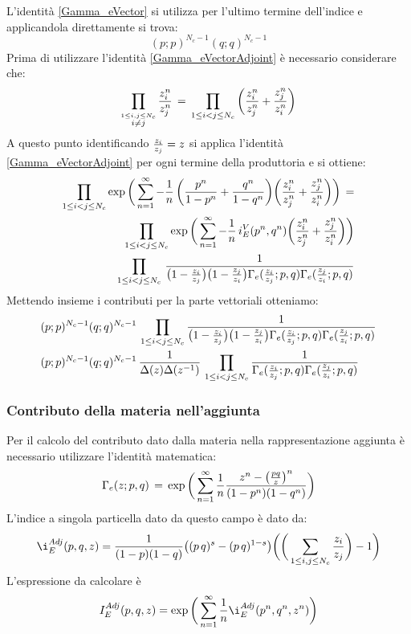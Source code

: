 \documentclass[a4paper,12pt]{article}
\begin{document}
L'identità \ref{Gamma_eVector} si utilizza per l'ultimo termine dell'indice e applicandola direttamente si trova:
$$
	(p;p)^{N_c-1} ( q;q)^{N_c-1}
$$
 Prima di utilizzare l'identità \ref{Gamma_eVectorAdjoint} è necessario considerare che:
 $$
 \prod_{ \overset{ 1 \leq i,j \leq N_c}{ i\neq j }} {z_i^n \over z_j^n} \,  = \, 
  \prod_{ 1 \leq i < j \leq N_c}\bigg( {z_i^n \over z_j^n} + {z_j^n \over z_i^n}   \bigg)
 $$
 A questo punto identificando $ {z_i \over z_j} = z$ si applica l'identità \ref{Gamma_eVectorAdjoint} per ogni termine della produttoria e si ottiene:
\begin{align*}
\prod_{ 1 \leq i < j \leq N_c} \exp \bigg( \sum_{n=1}^{\infty} - {1 \over n} \, \bigg( {p^n \over 1-p^n} + {q^n \over 1-q^n} \bigg)  \bigg( {z_i^n \over z_j^n} + {z_j^n \over z_i^n}\bigg) \bigg) \, =\\
\prod_{ 1 \leq i < j \leq N_c} \exp \bigg( \sum_{n=1}^{\infty} - {1 \over n} \, i_E^V(p^n,q^n)  \bigg( {z_i^n \over z_j^n} + {z_j^n \over z_i^n}\bigg) \bigg) 
\\
 \prod_{ 1 \leq i < j \leq N_c}   \, \frac{ 1 } { \big( 1 -{ z_i \over z_j} \big) \big ( 1 - { z_j \over z_i} \big) \Gamma_e( {z_i \over z_j};p,q) \Gamma_e({z_j \over z_i}; p,q)  }
\end{align*}
 Mettendo insieme i contributi per la parte vettoriali otteniamo:
 \begin{align*}
& (p;p)^{N_c-1} ( q;q)^{N_c-1} \, \prod_{ 1 \leq i < j \leq N_c} \frac{ 1 }{ \big( 1 -{ z_i \over z_j} \big) \big ( 1 - { z_j \over z_i} \big) \Gamma_e( {z_i \over z_j};p,q) \Gamma_e({z_j \over z_i}; p,q)  } \\
& (p;p)^{N_c-1} ( q;q)^{N_c-1} \, \frac{1}{ \Delta(z) \Delta (z^{-1})} \, \prod_{ 1 \leq i < j \leq N_c} \frac{ 1 }{ \Gamma_e( {z_i \over z_j};p,q) \Gamma_e({z_j \over z_i}; p,q)} 
\end{align*}
\subsubsection{Contributo della materia nell'aggiunta}
Per il calcolo del contributo dato dalla materia nella rappresentazione aggiunta è necessario utilizzare l'identità matematica:
$$
\Gamma_e(z;p,q) \, = \, \exp \bigg( \sum_{n=1}^{\infty} {1 \over n }
 \frac{ z^n - \big( {pq \over z} \big)^n }{(1-p^n) ( 1-q^n)} \bigg)
 \label{Gamma_eChiral}
$$
L'indice a singola particella dato da questo campo è dato da:
$$
\i_E^{Adj}(p,q,z) = {1 \over (1-p)(1-q)}
\big((p\,q)^{s}- (p\,q)^{1-s}\big) \bigg( \bigg(  \sum_{ 1 \leq i,j \leq N_c}  {z_i\over z_j}  \bigg)- 1 \bigg)
$$
L'espressione da calcolare è
\begin{equation}
I_E^{Adj}(p,q,z)  = \exp \bigg(  \sum_{n=1}^{\infty} {1 \over n } \i_E^{Adj}(p^n,q^n,z^n) \bigg)
\end{equation}
\end{document}
